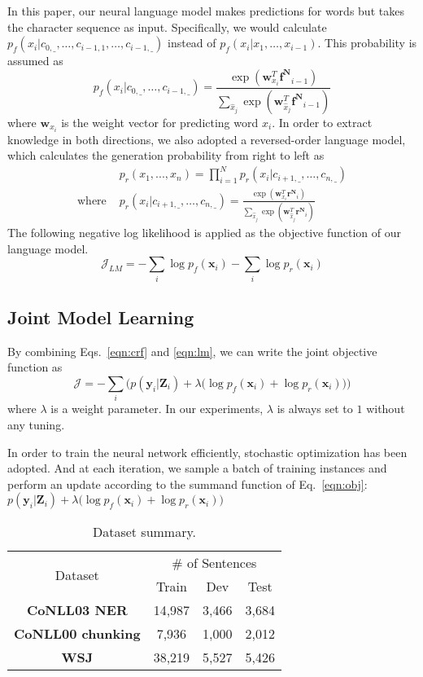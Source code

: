\documentclass[letterpaper]{article} \usepackage{aaai18}  \usepackage{times}  \usepackage{helvet}  \usepackage{courier}  \usepackage{url}  \usepackage{graphicx}  \usepackage{multirow}
\newcommand{\saft}{}
\def \myspace {\_}
\def \w {\mathbf{w}}
\def \x {\mathbf{x}}
\def \y {\mathbf{y}}
\def \Z {\mathbf{Z}}
\def \fw {\mathbf{f^{N}}}
\def \rw {\mathbf{r^{N}}}
\begin{document}
In this paper, our neural language model makes predictions for words but takes the character sequence as input. Specifically, we would calculate $p_f(x_i| c_{0, \myspace}, \dots, c_{i-1, 1}, \dots, c_{i-1, \myspace})$ instead of $p_f(x_i | x_1, \dots, x_{i-1})$. This probability is assumed as
$$
p_f(x_i| c_{0, \myspace}, \dots, c_{i-1, \myspace}) = \frac{\exp(\w_{x_i}^T \fw_{i-1})}{\sum_{\hat{x}_j} \exp(\w_{\hat{x}_j}^T \fw_{i-1})}
$$
where $\w_{x_i}$ is the weight vector for predicting word $x_i$.
In order to extract knowledge in both directions, we also adopted a reversed-order language model, 
which calculates the generation probability from right to left as
\begin{align*}
&p_r(x_1, ..., x_n) = \prod_{i=1}^N p_r(x_i| c_{i+1, \myspace}, \dots, c_{n, \myspace}) \\
\mbox{where }& p_r(x_i| c_{i+1, \myspace}, \dots, c_{n, \myspace}) = \frac{\exp(\w_{x_i}^T \rw_{i})}{\sum_{\hat{x}_j} \exp(\w_{\hat{x}_j}^T \rw_{i})}
\end{align*}
The following negative log likelihood is applied as the objective function of our language model.
\begin{equation}
\mathcal{J}_{LM} = -\sum_{i} \log p_f(\x_i) -\sum_{i} \log p_r(\x_i)
\label{eqn:lm}
\end{equation}

\subsection{Joint Model Learning}

By combining Eqs.~\ref{eqn:crf} and \ref{eqn:lm}, we can write the joint objective function as
\begin{equation}
\mathcal{J} = -\sum_{i} \Big( p(\y_i | \Z_i) + \lambda \big( \log p_f(\x_i) + \log p_r(\x_i) \big) \Big)
\label{eqn:obj}
\end{equation}
where $\lambda$ is a weight parameter. In our experiments, $\lambda$ is always set to $1$ without any tuning.

In order to train the neural network efficiently, stochastic optimization has been adopted. And at each iteration, we sample a batch of training instances and perform an update according to the summand function of Eq.~\ref{eqn:obj}: $
p(\y_i | \Z_i) + \lambda \big( \log p_f(\x_i) + \log p_r(\x_i) \big)
$ 


\begin{table}[t]
\center
\begin{tabular}{c||c|c|c}
\hline
\multirow{2}{*}{Dataset}& \multicolumn{3}{|c}{\# of Sentences} \\
\cline{2-4}
&  Train & Dev & Test\\
\hline
\hline
\textbf{CoNLL03 NER} & 14,987 & 3,466 & 3,684 \\
\hline
\textbf{CoNLL00 chunking} & 7,936 & 1,000 & 2,012 \\
\hline
\textbf{WSJ} & 38,219 & 5,527 & 5,426 \\
\hline
\end{tabular}
\caption{Dataset summary.}\label{tbl:dataset}
\saft
\end{table}
\end{document}
